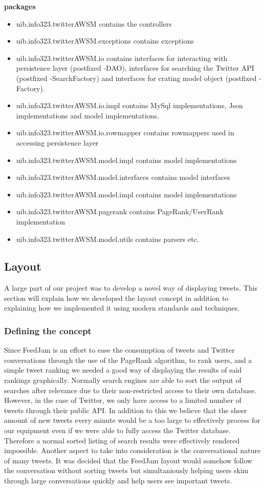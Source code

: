 {\bf packages}
\begin{itemize}
  \item uib.info323.twitterAWSM contains the controllers
  \item uib.info323.twitterAWSM.exceptions contains exceptions
  \item uib.info323.twitterAWSM.io contains interfaces for interacting with persistence layer (postfixed -DAO), interfaces for searching the Twitter API (postfixed -SearchFactory) and interfaces for crating model object (postfixed -Factory).
  \item uib.info323.twitterAWSM.io.impl contains MySql implementations, Json implementations and model implementations. 
  \item uib.info323.twitterAWSM.io.rowmapper contains rowmappers used in accessing persistence layer
  \item uib.info323.twitterAWSM.model.impl contains model implementations
  \item uib.info323.twitterAWSM.model.interfaces contains model interfaces
  \item uib.info323.twitterAWSM.model.impl contains model implementations
  \item uib.info323.twitterAWSM.pagerank contains PageRank/UserRank implementation
  \item uib.info323.twitterAWSM.model.utils contains parsers etc.
\end{itemize}

\subsection{Layout} %
A large part of our project was to develop a novel way of displaying tweets. This section will explain how we developed the layout concept in addition to explaining how we implemented it using modern standards and techniques.

\subsubsection{Defining the concept}
Since FeedJam is an effort to ease the consumption of tweets and Twitter conversations through the use of the PageRank algorithm, to rank users, and a simple tweet ranking we needed a good way of displaying the results of said rankings graphically. Normally search engines are able to sort the output of searches after relevance due to their non-restricted access to their own database. However, in the case of Twitter, we only have access to a limited number of tweets through their public API. In addition to this we believe that the sheer amount of new tweets every minute would be a too large to effectively process for our equipment even if we were able to fully access the Twitter database. Therefore a normal sorted listing of search results were effectively rendered impossible. Another aspect to take into consideration is the conversational nature of many tweets. It was decided that the FeedJam layout would somehow follow the conversation without sorting tweets but simultaniously helping users skim through large conversations quickly and help users see important tweets.

